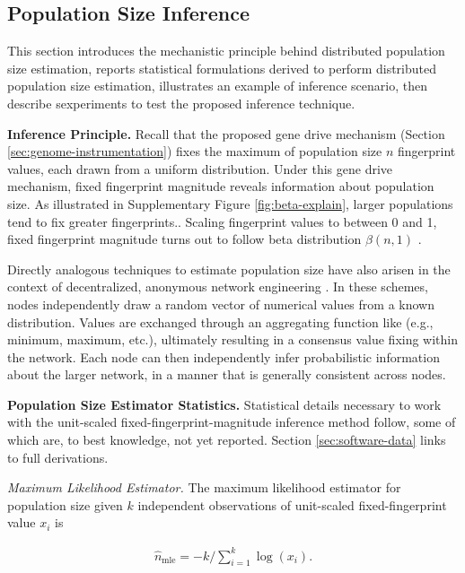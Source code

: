\subsection{Population Size Inference}
\label{sec:population-size-inference}

This section introduces the mechanistic principle behind distributed population size estimation, reports statistical formulations derived to perform distributed population size estimation, illustrates an example of inference scenario, then describe sexperiments to test the proposed inference technique.

\textbf{Inference Principle.}
Recall that the proposed gene drive mechanism (Section \ref{sec:genome-instrumentation}) fixes the maximum of population size $n$ fingerprint values, each drawn from a uniform distribution.
Under this gene drive mechanism, fixed fingerprint magnitude reveals information about population size.
As illustrated in Supplementary Figure \ref{fig:beta-explain}, larger populations tend to fix greater fingerprints..
Scaling fingerprint values to between 0 and 1, fixed fingerprint magnitude turns out to follow beta distribution $\beta(n, 1)$ \citep{gentle2009computational}.

Directly analogous techniques to estimate population size have also arisen in the context of decentralized, anonymous network engineering \citep{varagnolo2010distributed,hakan2012distributed}.
In these schemes, nodes independently draw a random vector of numerical values from a known distribution.
Values are exchanged through an aggregating function like (e.g., minimum, maximum, etc.), ultimately resulting in a consensus value fixing within the network.
Each node can then independently infer probabilistic information about the larger network, in a manner that is generally consistent across nodes.

\textbf{Population Size Estimator Statistics.}
Statistical details necessary to work with the unit-scaled fixed-fingerprint-magnitude inference method follow, some of which are, to best knowledge, not yet reported.
Section \ref{sec:software-data} links to full derivations.

\textit{Maximum Likelihood Estimator.}
The maximum likelihood estimator for population size given $k$ independent observations of unit-scaled fixed-fingerprint value $x_i$ is
\begin{footnotesize}
\begin{align} \label{eqn:popsize_mle}
\hat{n}_\mathrm{mle} = -k/\textstyle\sum_{i=1}^k \log( x_i ).
\end{align}
\end{footnotesize}

